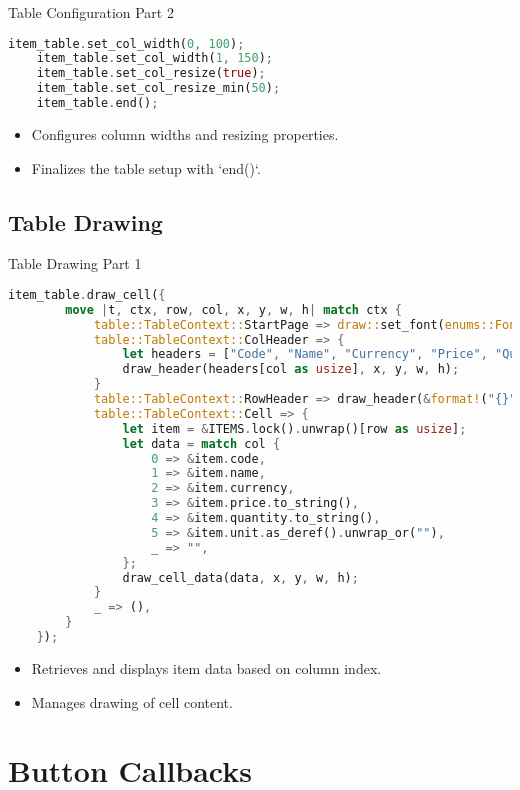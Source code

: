 \documentclass[aspectratio=169, table]{beamer}
\begin{document}
\begin{frame}[fragile]{Table Configuration Part 2}
\begin{lstlisting}[language=Rust]
	item_table.set_col_width(0, 100);
	item_table.set_col_width(1, 150);
	item_table.set_col_resize(true);
	item_table.set_col_resize_min(50);
	item_table.end();
\end{lstlisting}

\begin{itemize}
	\item Configures column widths and resizing properties.
	\item Finalizes the table setup with `end()`.
\end{itemize}
\end{frame}

\subsection{Table Drawing}
\begin{frame}[fragile]{Table Drawing Part 1}
\begin{lstlisting}[language=Rust]
	item_table.draw_cell({
		move |t, ctx, row, col, x, y, w, h| match ctx {
			table::TableContext::StartPage => draw::set_font(enums::Font::Helvetica, 14),
			table::TableContext::ColHeader => {
				let headers = ["Code", "Name", "Currency", "Price", "Quantity", "Unit"];
				draw_header(headers[col as usize], x, y, w, h);
			}
			table::TableContext::RowHeader => draw_header(&format!("{}", row + 1), x, y, w, h),
			table::TableContext::Cell => {
				let item = &ITEMS.lock().unwrap()[row as usize];
				let data = match col {
					0 => &item.code,
					1 => &item.name,
					2 => &item.currency,
					3 => &item.price.to_string(),
					4 => &item.quantity.to_string(),
					5 => &item.unit.as_deref().unwrap_or(""),
					_ => "",
				};
				draw_cell_data(data, x, y, w, h);
			}
			_ => (),
		}
	});
\end{lstlisting}

\begin{itemize}
	\item Retrieves and displays item data based on column index.
	\item Manages drawing of cell content.
\end{itemize}
\end{frame}

\section{Button Callbacks}
\end{document}
